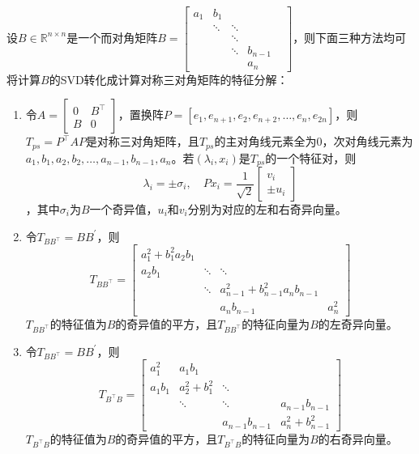 \documentclass[12pt,a4paper]{article}
\begin{document}
设$B \in \mathbb{R}^{n \times n}$是一个而对角矩阵$B=\left[\begin{array}{cccccc}{a_{1}} & {b_{1}} & {} & {} & {} \\ {} & {\ddots} & {\ddots} & {} \\ {} & {} & {\ddots} & {} & {} \\ {} & {} & {\ddots} & {b_{n-1}} \\ {} & {} & {} & {a_{n}}\end{array}\right]$，则下面三种方法均可将计算$B$的SVD转化成计算对称三对角矩阵的特征分解：
\begin{enumerate}[(1)]
	\item 令$A=\left[\begin{array}{ll}{0} & {B^{\top}} \\ {B} & {0}\end{array}\right]$，置换阵$P=\left[e_{1}, e_{n+1}, e_{2}, e_{n+2}, \ldots, e_{n}, e_{2 n}\right]$，则$T_{p s}=P^{\top} A P$是对称三对角矩阵，且$T_{p s}$的主对角线元素全为0，次对角线元素为$a_{1}, b_{1}, a_{2}, b_{2}, \dots, a_{n-1}, b_{n-1}, a_{n}$。若$\left(\lambda_{i}, x_{i}\right)$是$T_{p s}$的一个特征对，则$$
	\lambda_{i}=\pm \sigma_{i}, \quad P x_{i}=\frac{1}{\sqrt{2}}\left[\begin{array}{c}{v_{i}} \\ { \pm u_{i}}\end{array}\right]
	$$，其中$\sigma_{i}$为$B$一个奇异值，$u_i$和$v_i$分别为对应的左和右奇异向量。
	\item 令$T_{B B^{\top}}=B B^{\prime}$，则$$
	T_{B B^{\top}}=\left[\begin{array}{cccc}{a_{1}^{2}+b_{1}^{2} a_{2} b_{1}} & {} & {} \\ {a_{2} b_{1}} & {\ddots} & {\ddots} & {} \\ {} & {\ddots} & {a_{n-1}^{2}+b_{n-1}^{2} a_{n} b_{n-1}} \\ {} & {} & {a_{n} b_{n-1}} & {a_{n}^{2}}\end{array}\right]
	$$
	$T_{B B^{\top}}$的特征值为$B$的奇异值的平方，且$T_{B B^{\top}}$的特征向量为$B$的左奇异向量。
	\item 令$T_{B B^{\top}}=B B^{\prime}$，则$$
	T_{B^{\top} B}=\left[\begin{array}{cccc}{a_{1}^{2}} & {a_{1} b_{1}} \\ {a_{1} b_{1}} & {a_{2}^{2}+b_{1}^{2}} & {\ddots} \\ {} & {\ddots} & {\ddots} & {a_{n-1} b_{n-1}} \\ {} & {} & {a_{n-1} b_{n-1}} & {a_{n}^{2}+b_{n-1}^{2}}\end{array}\right]
	$$
	$T_{B^{\top} B}$的特征值为$B$的奇异值的平方，且$T_{B^{\top} B}$的特征向量为$B$的右奇异向量。
\end{enumerate}
\end{document}
